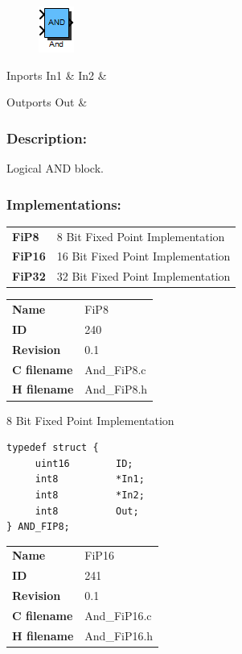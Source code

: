 \label{block:And}
\begin{figure}[H]\includegraphics{And}\end{figure} 

\begin{XtoCtabular}{Inports}
In1 & \tabularnewline
\hline
In2 & \tabularnewline
\hline
\end{XtoCtabular}


\begin{XtoCtabular}{Outports}
Out & \tabularnewline
\hline
\end{XtoCtabular}

\subsubsection*{Description:}
Logical AND block.

\subsubsection*{Implementations:}
\begin{tabular}{l l}
\textbf{FiP8} & 8 Bit Fixed Point Implementation\tabularnewline
\textbf{FiP16} & 16 Bit Fixed Point Implementation\tabularnewline
\textbf{FiP32} & 32 Bit Fixed Point Implementation\tabularnewline
\end{tabular}

\nopagebreak[0]
\begin{tabular}{l l}
\textbf{Name} & FiP8 \tabularnewline
\textbf{ID} & 240 \tabularnewline
\textbf{Revision} & 0.1 \tabularnewline
\textbf{C filename} & And\_FiP8.c \tabularnewline
\textbf{H filename} & And\_FiP8.h \tabularnewline
\end{tabular}
\vspace{1ex}

8 Bit Fixed Point Implementation

\begin{lstlisting}
typedef struct {
     uint16        ID;
     int8          *In1;
     int8          *In2;
     int8          Out;
} AND_FIP8;
\end{lstlisting}

\ifdefined \AddTestReports
{}
\fi
{}
\nopagebreak[0]
\begin{tabular}{l l}
\textbf{Name} & FiP16 \tabularnewline
\textbf{ID} & 241 \tabularnewline
\textbf{Revision} & 0.1 \tabularnewline
\textbf{C filename} & And\_FiP16.c \tabularnewline
\textbf{H filename} & And\_FiP16.h \tabularnewline
\end{tabular}
\vspace{1ex}

